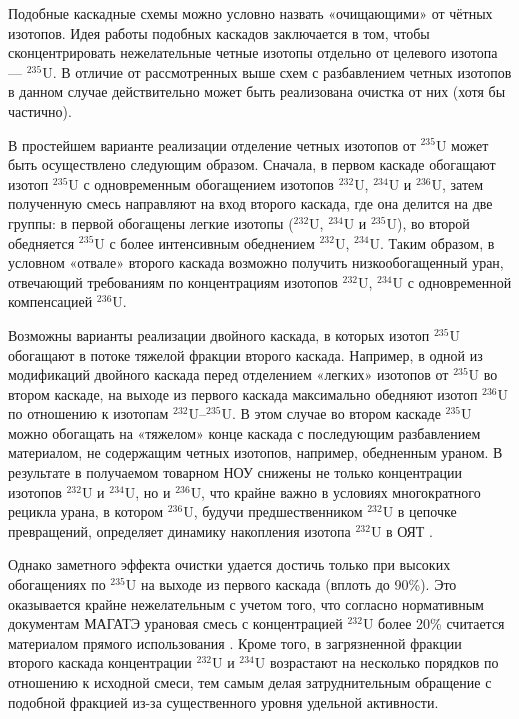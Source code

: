 Подобные каскадные схемы можно условно назвать «очищающими» от чётных изотопов. Идея работы подобных каскадов заключается в том, чтобы сконцентрировать нежелательные четные изотопы отдельно от целевого изотопа --- $^{235}$U. В отличие от рассмотренных выше схем с разбавлением четных изотопов в данном случае действительно может быть реализована очистка от них (хотя бы частично).

В простейшем варианте  реализации отделение четных изотопов от $^{235}$U может быть осуществлено следующим образом. Сначала, в первом каскаде обогащают изотоп $^{235}$U с одновременным обогащением изотопов $^{232}$U, $^{234}$U и $^{236}$U, затем полученную смесь направляют на вход второго каскада, где она делится на две группы: в первой обогащены легкие изотопы ($^{232}$U, $^{234}$U и $^{235}$U), во второй обедняется $^{235}$U с более интенсивным обеднением $^{232}$U, $^{234}$U. Таким образом, в условном «отвале» второго каскада возможно получить низкообогащенный уран, отвечающий требованиям по концентрациям изотопов $^{232}$U, $^{234}$U с одновременной компенсацией $^{236}$U.

Возможны варианты реализации двойного каскада, в которых изотоп $^{235}$U обогащают в потоке тяжелой фракции второго каскада. Например, в одной из модификаций двойного каскада перед отделением «легких» изотопов от $^{235}$U во втором каскаде, на выходе из первого каскада максимально обедняют изотоп $^{236}$U по отношению к изотопам $^{232}$U–$^{235}$U. В этом случае во втором каскаде $^{235}$U можно обогащать на «тяжелом» конце каскада с последующим разбавлением материалом, не содержащим четных изотопов, например, обедненным ураном. В результате в получаемом товарном НОУ снижены не только концентрации изотопов $^{232}$U и $^{234}$U, но и $^{236}$U, что крайне важно в условиях многократного рецикла урана, в котором $^{236}$U, будучи предшественником $^{232}$U в цепочке превращений, определяет динамику накопления изотопа $^{232}$U в ОЯТ \cite{smirnovEvolutionIsotopicComposition2012}.

Однако заметного эффекта очистки удается достичь только при высоких обогащениях по $^{235}$U на выходе из первого каскада (вплоть до 90\%). Это оказывается крайне нежелательным с учетом того, что согласно нормативным документам МАГАТЭ урановая смесь с концентрацией $^{232}$U более 20\% считается материалом прямого использования \cite{ManagementHighEnriched2005}. Кроме того, в загрязненной фракции второго каскада концентрации $^{232}$U и $^{234}$U возрастают на несколько порядков по отношению к исходной смеси, тем самым делая затруднительным обращение с подобной фракцией из-за существенного уровня удельной активности.

